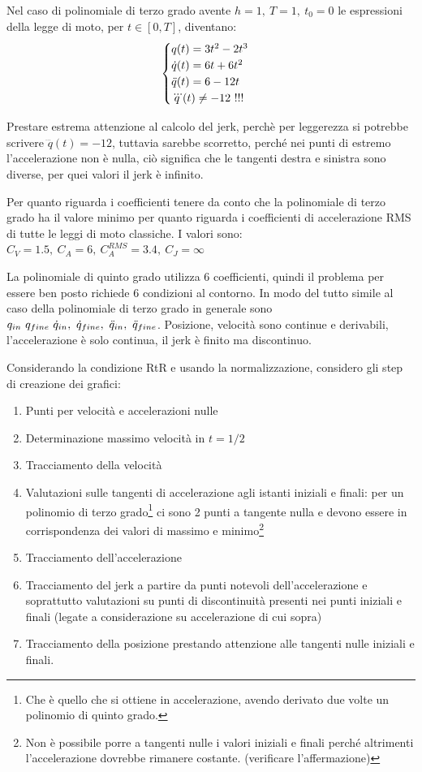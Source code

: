 Nel caso di polinomiale di terzo grado avente \(h=1, \ T=1, \ t_0=0\) le espressioni della legge di moto, per \(t\in[0,T]\), diventano:
\[\begin{cases}
    q(t) = 3 t^2 - 2 t^3 \\
    \dot{q}(t) = 6 t + 6 t^2 \\
    \Ddot{q}(t) = 6 - 12 t \\
    \dddot{q}(t) \neq -12 \ !!!
\end{cases}\]

Prestare estrema attenzione al calcolo del jerk, perchè per leggerezza si potrebbe scrivere \(\dddot{q}(t) = -12\), tuttavia sarebbe scorretto, perché nei punti di estremo l'accelerazione non è nulla, ciò significa che le tangenti destra e sinistra sono diverse, per quei valori il jerk è infinito.

Per quanto riguarda i coefficienti tenere da conto che la polinomiale di terzo grado ha il valore minimo per quanto riguarda i coefficienti di accelerazione RMS di tutte le leggi di moto classiche. I valori sono: \(C_V=1.5, \ C_A = 6, \ C_A^{RMS}=3.4, \ C_J = \infty\)


La polinomiale di quinto grado utilizza 6 coefficienti, quindi il problema per essere ben posto richiede 6 condizioni al contorno. In modo del tutto simile al caso della polinomiale di terzo grado in generale sono \(q_{in} \ q_{fine} \ \dot{q}_{in}, \ \dot{q}_{fine}, \ \Ddot{q}_{in}, \ \Ddot{q}_{fine}\).
Posizione, velocità sono continue e derivabili, l'accelerazione è solo continua, il jerk è finito ma discontinuo.

Considerando la condizione RtR e usando la normalizzazione, considero gli step di creazione dei grafici:
\begin{enumerate}
    \item Punti per velocità e accelerazioni nulle
    \item Determinazione massimo velocità in \(t=1/2\)
    \item Tracciamento della velocità
    \item Valutazioni sulle tangenti di accelerazione agli istanti iniziali e finali: per un polinomio di terzo grado\footnote{Che è quello che si ottiene in accelerazione, avendo derivato due volte un polinomio di quinto grado.} ci sono 2 punti a tangente nulla e devono essere in corrispondenza dei valori di massimo e minimo\footnote{Non è possibile porre a tangenti nulle i valori iniziali e finali perché altrimenti l'accelerazione dovrebbe rimanere costante. {\color{red}(verificare l'affermazione)}}
    \item Tracciamento dell'accelerazione
    \item Tracciamento del jerk a partire da punti notevoli dell'accelerazione e soprattutto valutazioni su punti di discontinuità presenti nei punti iniziali e finali (legate a considerazione su accelerazione di cui sopra)
    \item Tracciamento della posizione prestando attenzione alle tangenti nulle iniziali e finali.
\end{enumerate}

